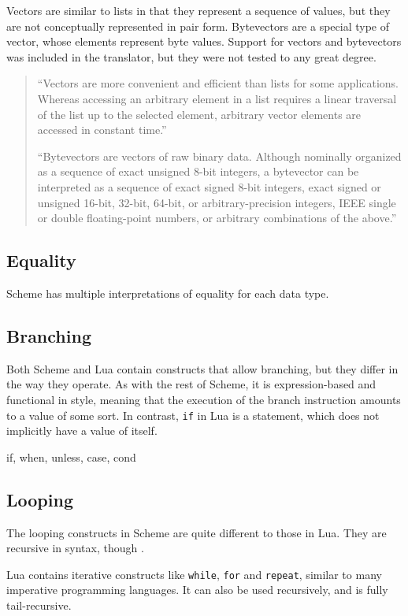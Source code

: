 Vectors are similar to lists in that they represent a sequence of values, but
they are not conceptually represented in pair form. Bytevectors are a special
type of vector, whose elements represent byte values. Support for vectors and
bytevectors was included in the translator, but they were not tested to any
great degree.
\begin{quotation}
``Vectors are more convenient and efficient than lists for some applications.
Whereas accessing an arbitrary element in a list requires a linear traversal of
the list up to the selected element, arbitrary vector elements are accessed in
constant time.''~\cite[Sec~6.9]{tspl}

``Bytevectors are vectors of raw binary data. Although nominally organized as a
sequence of exact unsigned 8-bit integers, a bytevector can be interpreted as a
sequence of exact signed 8-bit integers, exact signed or unsigned 16-bit,
32-bit, 64-bit, or arbitrary-precision integers, IEEE single or double
floating-point numbers, or arbitrary combinations of the
above.''~\cite[Sec~6.10]{tspl}
\end{quotation} 

\subsection{Equality}

Scheme has multiple interpretations of equality for each data type.

\subsection{Branching}

Both Scheme and Lua contain constructs that allow branching, but they differ in
the way they operate. As with the rest of Scheme, it is expression-based and
functional in style, meaning that the execution of the branch instruction
amounts to a value of some sort. In contrast, \texttt{if} in Lua is a statement,
which does not implicitly have a value of itself.

if, when, unless, case, cond

\subsection{Looping}

The looping constructs in Scheme are quite different to those in Lua. They are
recursive in syntax, though .

Lua contains iterative constructs like \texttt{while}, \texttt{for} and
\texttt{repeat}, similar to many imperative programming languages. It can also
be used recursively, and is fully tail-recursive.

